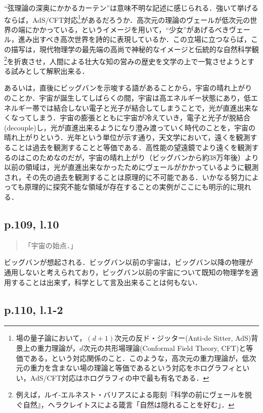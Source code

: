 \documentclass[10pt, a5paper, twoside]{jsarticle}
\theoremstyle{definition}
\begin{document}
			“弦理論の深奥にかかるカーテン”は意味不明な記述に感じられる．強いて挙げるならば，AdS/CFT対応\footnote{場の量子論において，$(d+1)$次元の反ド・ジッター(Anti-de Sitter, AdS)背景上の重力理論が，$d$次元の共形場理論(Conformal Field Theory, CFT)と等価である，という対応関係のこと．このような，高次元の重力理論が，低次元の重力を含まない場の理論と等価であるという対応をホログラフィといい，AdS/CFT対応はホログラフィの中で最も有名である\cite{hkt}．}があるだろうか．高次元の理論のヴェールが低次元の世界の端にかかっている，というイメージを用いて，“少女”があげるべきヴェール，進み出すべき高次世界を詩的に表現しているか．この立場に立つならば，この描写は，現代物理学の最先端の高尚で神秘的なイメージと伝統的な自然科学観\footnote{例えば，ルイ-エルネスト・バリアスによる彫刻『科学の前にヴェールを脱ぐ自然』，ヘラクレイトスによる箴言「自然は隠れることを好む」．}を折衷させ，人間による壮大な知の営みの歴史を文学の上で一覧させようとする試みとして解釈出来る．

			あるいは，直後にビッグバンを示唆する語があることから，宇宙の晴れ上がりのことか．宇宙が誕生してしばらくの間，宇宙は高エネルギー状態にあり，低エネルギー帯では結合しない電子と光子が結合してしまうことで，光が直進出来なくなってしまう．宇宙の膨張とともに宇宙が冷えていき，電子と光子が脱結合(decouple)し，光が直進出来るようになり澄み渡っていく時代のことを，宇宙の晴れ上がりという．光年という単位が示す通り，天文学において，遠くを観測することは過去を観測することと等価である．高性能の望遠鏡でより遠くを観測するのはこのためなのだが，宇宙の晴れ上がり（ビッグバンから約38万年後）より以前の領域は，光が直進出来なかったためにヴェールがかかっているように観測され，その先の過去を観測することは原理的に不可能である．いかなる努力によっても原理的に探究不能な領域が存在することの実例がここにも明示的に現れる．

		\subsection{p.109, l.10}

			\begin{quote}

				「宇宙の始点．」
				
			\end{quote}

			ビッグバンが想起される．ビッグバン以前の宇宙は，ビッグバン以降の物理が通用しないと考えられており，ビッグバン以前の宇宙について既知の物理学を適用することは出来ず，科学として言及出来ることは何もない．

		\subsection{p.110, l.1-2}
\end{document}
